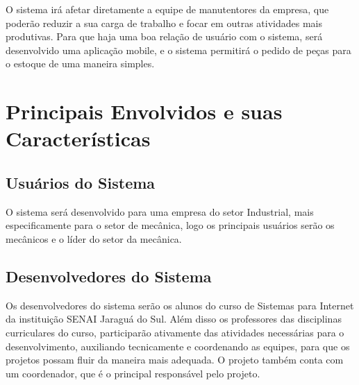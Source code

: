 O sistema irá afetar diretamente a equipe de manutentores da empresa, que poderão reduzir a sua carga de trabalho e focar em outras atividades mais produtivas. Para que haja uma boa relação de usuário com o sistema, será desenvolvido uma aplicação mobile, e o sistema permitirá o pedido de peças para o estoque de uma maneira simples.
\section{Principais Envolvidos e suas Características}
\subsection{Usuários do Sistema}
O sistema será desenvolvido para uma empresa do setor Industrial, mais especificamente para o setor de mecânica, logo os principais usuários serão os mecânicos e o líder do setor da mecânica.

\subsection{Desenvolvedores do Sistema}
Os desenvolvedores do sistema serão os alunos do curso de Sistemas para Internet da instituição SENAI Jaraguá do Sul. Além disso os professores das disciplinas curriculares do curso, participarão ativamente das atividades necessárias para o desenvolvimento, auxiliando tecnicamente e coordenando as equipes, para que os projetos possam fluir da maneira mais adequada. O projeto também conta com um coordenador, que é o principal responsável pelo projeto.
